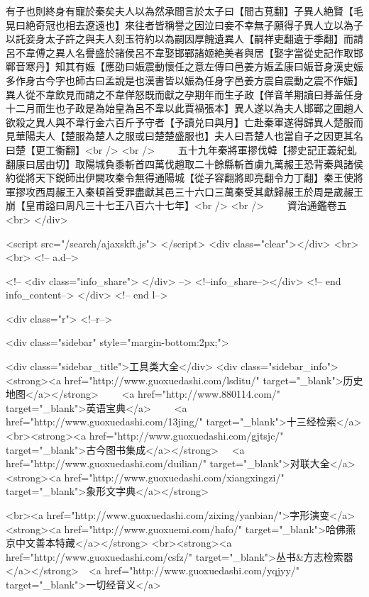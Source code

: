 有子也則終身有寵於秦矣夫人以為然承間言於太子曰【間古莧翻】子異人絶賢【毛晃曰絶奇冠也相去遼遠也】來往者皆稱譽之因泣曰妾不幸無子願得子異人立以為子以託妾身太子許之與夫人刻玉符約以為嗣因厚餽遺異人【嗣祥吏翻遺于季翻】而請呂不韋傅之異人名譽盛於諸侯呂不韋娶邯鄲諸姬絶美者與居【娶字當從史記作取邯鄲音寒丹】知其有娠【應劭曰娠震動懷任之意左傳曰邑姜方娠孟康曰娠音身漢史娠多作身古今字也師古曰孟說是也漢書皆以娠為任身字邑姜方震自震動之震不作娠】異人從不韋飲見而請之不韋佯怒既而獻之孕期年而生子政【佯音羊期讀曰朞盖任身十二月而生也子政是為始皇為呂不韋以此賈禍張本】異人遂以為夫人邯鄲之圍趙人欲殺之異人與不韋行金六百斤予守者【予讀兑曰與月】亡赴秦軍遂得歸異人楚服而見華陽夫人【楚服為楚人之服或曰楚楚盛服也】夫人曰吾楚人也當自子之因更其名曰楚【更工衡翻】<br />
<br />
　　五十九年秦將軍摎伐韓【摎史記正義紀虬翻康曰居由切】取陽城負黍斬首四萬伐趙取二十餘縣斬首虜九萬赧王恐背秦與諸侯約從將天下鋭師出伊闕攻秦令無得通陽城【從子容翻將即亮翻令力丁翻】秦王使將軍摎攻西周赧王入秦頓首受罪盡獻其邑三十六口三萬秦受其獻歸赧王於周是歲赧王崩【皇甫謚曰周凡三十七王八百六十七年】<br />
<br />
　　資治通鑑卷五  <br>
   </div> 

<script src="/search/ajaxskft.js"> </script>
 <div class="clear"></div>
<br>
<br>
 <!-- a.d-->

 <!--
<div class="info_share">
</div> 
-->
 <!--info_share--></div>   <!-- end info_content-->
  </div> <!-- end l-->

<div class="r">   <!--r-->



<div class="sidebar"  style="margin-bottom:2px;">

 
<div class="sidebar_title">工具类大全</div>
<div class="sidebar_info">
<strong><a href="http://www.guoxuedashi.com/lsditu/" target="_blank">历史地图</a></strong>　　
<a href="http://www.880114.com/" target="_blank">英语宝典</a>　　
<a href="http://www.guoxuedashi.com/13jing/" target="_blank">十三经检索</a>　
<br><strong><a href="http://www.guoxuedashi.com/gjtsjc/" target="_blank">古今图书集成</a></strong>　
<a href="http://www.guoxuedashi.com/duilian/" target="_blank">对联大全</a>　<strong><a href="http://www.guoxuedashi.com/xiangxingzi/" target="_blank">象形文字典</a></strong>　

<br><a href="http://www.guoxuedashi.com/zixing/yanbian/">字形演变</a>　　<strong><a href="http://www.guoxuemi.com/hafo/" target="_blank">哈佛燕京中文善本特藏</a></strong>
<br><strong><a href="http://www.guoxuedashi.com/csfz/" target="_blank">丛书&方志检索器</a></strong>　<a href="http://www.guoxuedashi.com/yqjyy/" target="_blank">一切经音义</a>　　

